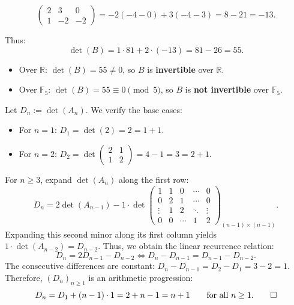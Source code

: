\begin{exercisesolution*}
\begin{itemize}
\[\begin{pmatrix}
      2 & 3 & 0 \\
      1 & -2 & -2
    \end{pmatrix}
    = -2(-4 - 0) + 3(-4 - 3) = 8 - 21 = -13.
    \]
\end{itemize}
Thus:
\[
\det(B) = 1 \cdot 81 + 2 \cdot (-13) = 81 - 26 = 55.
\]
\begin{itemize}
    \item Over $\mathbb{R}$: $\det(B) = 55 \ne 0$, so $B$ is \textbf{invertible} over $\mathbb{R}$.
    \item Over $\mathbb{F}_5$: $\det(B) = 55 \equiv 0 \pmod 5$, so $B$ is \textbf{not invertible} over $\mathbb{F}_5$. \qedhere
\end{itemize}
\end{exercisesolution*}

\begin{exercisesolution}
\label{sol:tridiagonal_toeplitz_determinant}
Let $D_n := \det(A_n)$. We verify the base cases:
\begin{itemize}
    \item For $n = 1$: $D_1 = \det(2) = 2 = 1 + 1$.
    \item For $n = 2$: $D_2 = \det \left(\begin{smallmatrix} 2 & 1 \\ 1 & 2 \end{smallmatrix}\right) = 4 - 1 = 3 = 2 + 1$.
\end{itemize}
For $n \ge 3$, expand $\det(A_n)$ along the first row:
\[
D_n = 2 \det(A_{n-1}) - 1 \cdot \det \begin{pmatrix}
  1 & 1 & 0 & \cdots & 0 \\
  0 & 2 & 1 & \cdots & 0 \\
  \vdots & 1 & 2 & \ddots & \vdots \\
  0 & 0 & \cdots & 1 & 2
\end{pmatrix}_{(n-1) \times (n-1)}.
\]
Expanding this second minor along its first column yields $1 \cdot \det(A_{n-2}) = D_{n-2}$.
Thus, we obtain the linear recurrence relation:
\[
D_n = 2 D_{n-1} - D_{n-2} \iff D_n - D_{n-1} = D_{n-1} - D_{n-2}.
\]
The consecutive differences are constant: $D_n - D_{n-1} = D_2 - D_1 = 3 - 2 = 1$.
Therefore, $(D_n)_{n \ge 1}$ is an arithmetic progression:
\[
D_n = D_1 + (n-1) \cdot 1 = 2 + n - 1 = n + 1 \qquad \text{for all } n \ge 1. \qedhere
\]
\end{exercisesolution}

